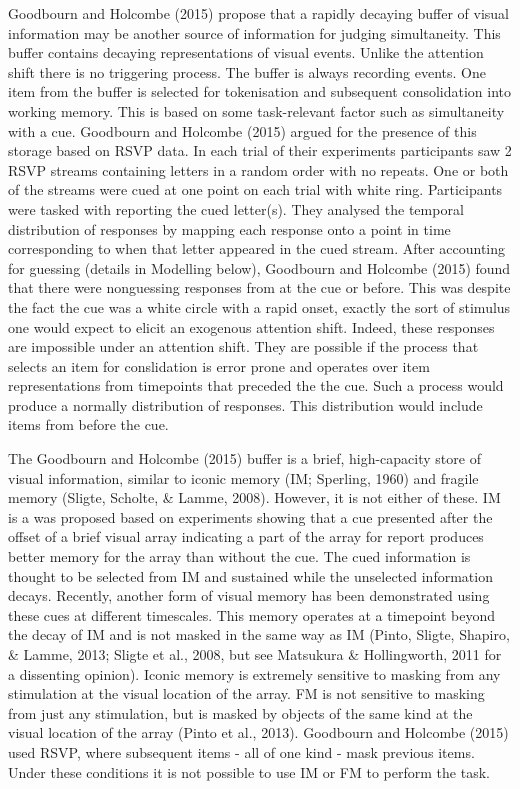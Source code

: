 \documentclass[,man,floatsintext]{apa6}
\theoremstyle{definition}
\theoremstyle{definition}
\theoremstyle{definition}
\theoremstyle{remark}
\begin{document}
Goodbourn and Holcombe (2015) propose that a rapidly decaying buffer of
visual information may be another source of information for judging
simultaneity. This buffer contains decaying representations of visual
events. Unlike the attention shift there is no triggering process. The
buffer is always recording events. One item from the buffer is selected
for tokenisation and subsequent consolidation into working memory. This
is based on some task-relevant factor such as simultaneity with a cue.
Goodbourn and Holcombe (2015) argued for the presence of this storage
based on RSVP data. In each trial of their experiments participants saw
2 RSVP streams containing letters in a random order with no repeats. One
or both of the streams were cued at one point on each trial with white
ring. Participants were tasked with reporting the cued letter(s). They
analysed the temporal distribution of responses by mapping each response
onto a point in time corresponding to when that letter appeared in the
cued stream. After accounting for guessing (details in Modelling below),
Goodbourn and Holcombe (2015) found that there were nonguessing
responses from at the cue or before. This was despite the fact the cue
was a white circle with a rapid onset, exactly the sort of stimulus one
would expect to elicit an exogenous attention shift. Indeed, these
responses are impossible under an attention shift. They are possible if
the process that selects an item for conslidation is error prone and
operates over item representations from timepoints that preceded the the
cue. Such a process would produce a normally distribution of responses.
This distribution would include items from before the cue.

The Goodbourn and Holcombe (2015) buffer is a brief, high-capacity store
of visual information, similar to iconic memory (IM; Sperling, 1960) and
fragile memory (Sligte, Scholte, \& Lamme, 2008). However, it is not
either of these. IM is a was proposed based on experiments showing that
a cue presented after the offset of a brief visual array indicating a
part of the array for report produces better memory for the array than
without the cue. The cued information is thought to be selected from IM
and sustained while the unselected information decays. Recently, another
form of visual memory has been demonstrated using these cues at
different timescales. This memory operates at a timepoint beyond the
decay of IM and is not masked in the same way as IM (Pinto, Sligte,
Shapiro, \& Lamme, 2013; Sligte et al., 2008, but see Matsukura \&
Hollingworth, 2011 for a dissenting opinion). Iconic memory is extremely
sensitive to masking from any stimulation at the visual location of the
array. FM is not sensitive to masking from just any stimulation, but is
masked by objects of the same kind at the visual location of the array
(Pinto et al., 2013). Goodbourn and Holcombe (2015) used RSVP, where
subsequent items - all of one kind - mask previous items. Under these
conditions it is not possible to use IM or FM to perform the task.
\end{document}
